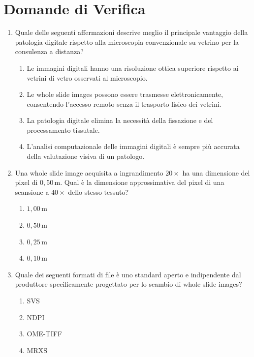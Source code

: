 \section{Domande di Verifica}

\begin{enumerate}

  \item \label{ch1:q1} Quale delle seguenti affermazioni descrive meglio il principale vantaggio della patologia digitale rispetto alla microscopia convenzionale su vetrino per la consulenza a distanza?
  \begin{enumerate}[label=\Alph*.]
    \item Le immagini digitali hanno una risoluzione ottica superiore rispetto ai vetrini di vetro osservati al microscopio.
    \item Le whole slide images possono essere trasmesse elettronicamente, consentendo l'accesso remoto senza il trasporto fisico dei vetrini.
    \item La patologia digitale elimina la necessità della fissazione e del processamento tissutale.
    \item L'analisi computazionale delle immagini digitali è sempre più accurata della valutazione visiva di un patologo.
  \end{enumerate}

  \item \label{ch1:q2} Una whole slide image acquisita a ingrandimento $20\times$ ha una dimensione del pixel di $0{,}50$\,\textmu m. Qual è la dimensione approssimativa del pixel di una scansione a $40\times$ dello stesso tessuto?
  \begin{enumerate}[label=\Alph*.]
    \item $1{,}00$\,\textmu m
    \item $0{,}50$\,\textmu m
    \item $0{,}25$\,\textmu m
    \item $0{,}10$\,\textmu m
  \end{enumerate}

  \item \label{ch1:q3} Quale dei seguenti formati di file è uno standard aperto e indipendente dal produttore specificamente progettato per lo scambio di whole slide images?
  \begin{enumerate}[label=\Alph*.]
    \item SVS
    \item NDPI
    \item OME-TIFF
    \item MRXS
  \end{enumerate}


\end{enumerate}

